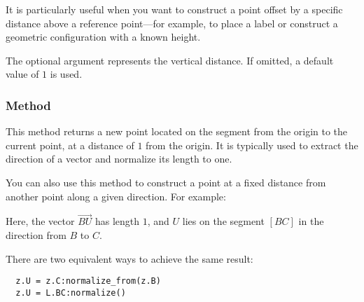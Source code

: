 \medskip
\noindent
It is particularly useful when you want to construct a point offset by a specific distance above a reference point—for example, to place a label or construct a geometric configuration with a known height.

\medskip
\noindent
The optional argument  represents the vertical distance. If omitted, a default value of $1$ is used.

\vspace{1em}


\begin{tkzexample}[latex = 7cm]
\begin{center}
\end{center}
\end{tkzexample}

\subsubsection{Method }
\label{ssub:method_normalize}

This method returns a new point located on the segment from the origin to the current point, at a distance of $1$ from the origin. It is typically used to extract the direction of a vector and normalize its length to one.

\medskip
\noindent
You can also use this method to construct a point at a fixed distance from another point along a given direction. For example:

\begin{center}
\end{center}

\noindent
Here, the vector $\overrightarrow{BU}$ has length $1$, and $U$ lies on the segment $[BC]$ in the direction from $B$ to $C$.

\medskip
\noindent
There are two equivalent ways to achieve the same result:

\begin{mybox}
\begin{verbatim}
  z.U = z.C:normalize_from(z.B)
  z.U = L.BC:normalize()
\end{verbatim}
\end{mybox}


